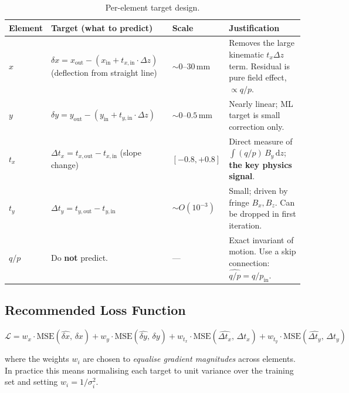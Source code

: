 \documentclass[11pt,a4paper]{article}
\begin{document}
\begin{table}[ht]
\centering
\caption{Per-element target design.}
\label{tab:targets}
\renewcommand{\arraystretch}{1.3}
\begin{tabular}{lp{5.5cm}lp{4.5cm}}
\toprule
\textbf{Element} & \textbf{Target (what to predict)} & \textbf{Scale} & \textbf{Justification} \\
\midrule
$x$ &
$\delta x = x_{\mathrm{out}} - (x_{\mathrm{in}} + t_{x,\mathrm{in}} \cdot \Delta z)$
\newline (deflection from straight line)
& $\sim\! 0$--$30$\,mm & Removes the large kinematic $t_x \Delta z$ term.
Residual is pure field effect, $\propto q/p$. \\
\midrule
$y$ &
$\delta y = y_{\mathrm{out}} - (y_{\mathrm{in}} + t_{y,\mathrm{in}} \cdot \Delta z)$
& $\sim\! 0$--$0.5$\,mm & Nearly linear; ML target is small correction only. \\
\midrule
$t_x$ &
$\Delta t_x = t_{x,\mathrm{out}} - t_{x,\mathrm{in}}$
\newline (slope change)
& $[-0.8, +0.8]$ & Direct measure of $\int (q/p)\,B_y\,\mathrm{d}z$;
\textbf{the key physics signal}. \\
\midrule
$t_y$ &
$\Delta t_y = t_{y,\mathrm{out}} - t_{y,\mathrm{in}}$
& $\sim\! O(10^{-3})$ & Small; driven by fringe $B_x, B_z$.
Can be dropped in first iteration. \\
\midrule
$q/p$ &
Do \textbf{not} predict.
& --- & Exact invariant of motion.
Use a skip connection: $\widehat{q/p} = q/p_{\mathrm{in}}$. \\
\bottomrule
\end{tabular}
\end{table}

\subsection{Recommended Loss Function}

\begin{equation}
\boxed{
\mathcal{L} =
  w_x \cdot \mathrm{MSE}(\widehat{\delta x},\, \delta x)
+ w_y \cdot \mathrm{MSE}(\widehat{\delta y},\, \delta y)
+ w_{t_x} \cdot \mathrm{MSE}(\widehat{\Delta t_x},\, \Delta t_x)
+ w_{t_y} \cdot \mathrm{MSE}(\widehat{\Delta t_y},\, \Delta t_y)
}
\label{eq:loss}
\end{equation}

\noindent
where the weights $w_i$ are chosen to \emph{equalise gradient magnitudes}
across elements.  In practice this means normalising each target to
unit variance over the training set and setting $w_i = 1/\sigma_i^2$.
\end{document}
